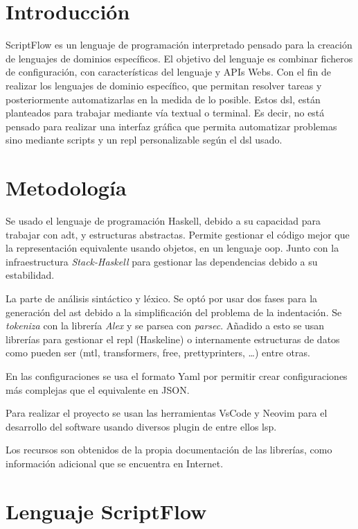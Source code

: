 \documentclass[11pt]{article}
\begin{document}
\newpage


\section{Introducción}
\label{sec:org446a515}

ScriptFlow es un lenguaje de programación interpretado pensado para la creación de lenguajes de dominios específicos. El objetivo del
lenguaje es combinar ficheros de configuración, con características del lenguaje y APIs Webs. Con el fin de realizar los lenguajes de dominio específico,
que permitan resolver tareas y posteriormente automatizarlas en la medida de lo posible. Estos \gls{dsl}, están planteados
para trabajar mediante vía textual o terminal. Es decir, no está pensado para realizar una interfaz gráfica que permita automatizar problemas sino mediante
scripts y un \gls{repl} personalizable según el \gls{dsl} usado.

\section{Metodología}
\label{sec:org26bd751}

Se usado el lenguaje de programación Haskell, debido a su capacidad para trabajar con \gls{adt}, y estructuras abstractas. Permite gestionar
el código mejor que la representación equivalente usando objetos, en un
lenguaje \gls{oop}. Junto con la infraestructura \emph{Stack-Haskell} para
gestionar las dependencias debido a su estabilidad.

La parte de análisis sintáctico y léxico. Se optó por usar dos fases para la generación del \gls{ast}
debido a la simplificación del problema de la indentación. Se \emph{tokeniza} con la librería \emph{Alex} y se parsea con \emph{parsec}.
Añadido a esto se usan librerías para gestionar el \gls{repl} (Haskeline) o internamente estructuras de datos como pueden ser (mtl, transformers, free, prettyprinters, \ldots{})
entre otras.

En las configuraciones se usa el formato Yaml por permitir crear configuraciones más complejas que el equivalente en JSON.

Para realizar el proyecto se usan las herramientas VsCode y Neovim para el desarrollo del software usando diversos
plugin de entre ellos \gls{lsp}.

Los recursos son obtenidos de la propia documentación de las librerías, como información adicional que se encuentra en Internet.

\section{Lenguaje ScriptFlow}
\label{sec:org32c6a7b}
\end{document}
